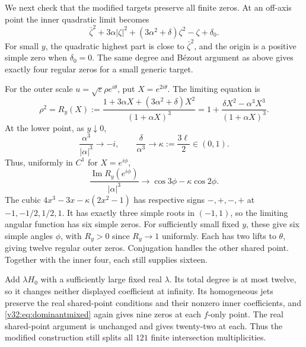 \documentclass[UTF8,11pt]{ctexart}
\theoremstyle{definition}
\numberwithin{equation}{section}
\begin{document}
We next check that the modified targets preserve all finite
zeros. At an off-axis point the inner quadratic limit becomes
\[
 \bar\zeta^2+3\alpha|\zeta|^2
       +(3\alpha^2+\delta)\zeta^2-\zeta+\delta_0.
\]
For small $y$, the quadratic highest part is close to
$\bar\zeta^2$, and the origin is a positive simple zero when
$\delta_0=0$. The same degree and B\'ezout argument as above
gives exactly four regular zeros for a small generic target.

For the outer scale $u=\sqrt\varepsilon\rho e^{i\theta}$,
put $X=e^{2i\theta}$. The limiting equation is
\begin{equation}\label{v33:eq:outerratio}
 \rho^2=R_y(X):=
 \frac{1+3\alpha X+(3\alpha^2+\delta)X^2}{(1+\alpha X)^3}
 =1+\frac{\delta X^2-\alpha^3X^3}{(1+\alpha X)^3}.
\end{equation}
At the lower point, as $y\downarrow0$,
\[
 \frac{\alpha^3}{|\alpha|^3}\longrightarrow-i,
 \qquad \frac{\delta}{\alpha^3}\longrightarrow
 \kappa:=\frac{3\ell}{2}\in(0,1).
\]
Thus, uniformly in $C^1$ for $X=e^{i\phi}$,
\[
 \frac{\operatorname{Im}R_y(e^{i\phi})}{|\alpha|^3}
 \longrightarrow\cos3\phi-\kappa\cos2\phi.
\]
The cubic $4x^3-3x-\kappa(2x^2-1)$ has respective signs
$-,+,-,+$ at $-1,-1/2,1/2,1$. It has exactly three simple
roots in $(-1,1)$, so the limiting angular function has six
simple zeros. For sufficiently small fixed $y$, these give six
simple angles $\phi$, with $R_y>0$ since $R_y\to1$ uniformly.
Each has two lifts to $\theta$, giving twelve regular outer
zeros. Conjugation handles the other shared point.
Together with the inner four, each still supplies sixteen.

Add $\lambda H_0$ with a sufficiently large fixed real
$\lambda$. Its total degree is at most twelve, so it changes
neither displayed coefficient at infinity. Its homogeneous
jets preserve the real shared-point conditions and their
nonzero inner coefficients, and \eqref{v32:eq:dominantmixed}
again gives nine zeros at each $f$-only point. The real
shared-point argument is unchanged and gives twenty-two at
each. Thus the modified construction still splits all $121$
finite intersection multiplicities.
\end{document}

